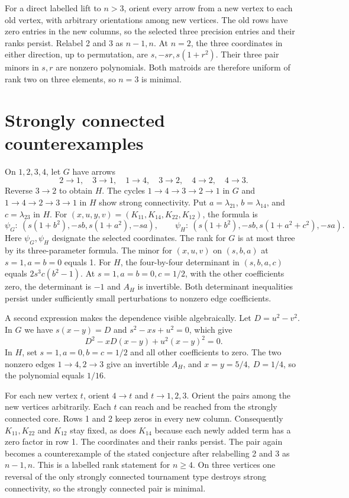 \documentclass[11pt,a4paper]{amsart}
\begin{document}
For a direct labelled lift to \(n>3\), orient every arrow from a
new vertex to each old vertex, with arbitrary orientations among
new vertices. The old rows have zero entries in the new columns,
so the selected three precision entries and their ranks persist.
Relabel 2 and 3 as \(n-1,n\).
At \(n=2\), the three coordinates in either direction, up to
permutation, are \(s,-sr,s(1+r^2)\). Their three pair minors in
\(s,r\) are nonzero polynomials. Both matroids are therefore uniform
of rank two on three elements, so \(n=3\) is minimal.

\section{Strongly connected counterexamples}

On \(1,2,3,4\), let \(G\) have arrows
\[
 2\to1,\quad3\to1,\quad1\to4,\quad3\to2,\quad4\to2,\quad4\to3 .
\]
Reverse \(3\to2\) to obtain \(H\). The cycles \(1\to4\to3\to2\to1\)
in \(G\) and \(1\to4\to2\to3\to1\) in \(H\) show strong connectivity.
Put \(a=\lambda_{21}\), \(b=\lambda_{14}\), and \(c=\lambda_{23}\)
in \(H\). For \((x,u,y,v)=(K_{11},K_{14},K_{22},K_{12})\), the formula is
\[
 \psi_G:\ (s(1+b^2),-sb,s(1+a^2),-sa),\qquad
 \psi_H:\ (s(1+b^2),-sb,s(1+a^2+c^2),-sa).
\]
Here \(\psi_G,\psi_H\) designate the selected coordinates.
The rank for \(G\) is at most three by its three-parameter formula.
The minor for \((x,u,v)\) on \((s,b,a)\) at \(s=1,a=b=0\)
equals 1. For \(H\), the four-by-four determinant in
\((s,b,a,c)\) equals \(2s^3c(b^2-1)\). At \(s=1,a=b=0,c=1/2\),
with the other coefficients zero, the determinant is \(-1\)
and \(A_H\) is invertible. Both determinant inequalities persist
under sufficiently small perturbations to nonzero edge coefficients.

A second expression makes the dependence visible algebraically.
Let \(D=u^2-v^2\). In \(G\) we have \(s(x-y)=D\) and
\(s^2-xs+u^2=0\), which give
\[
 D^2-xD(x-y)+u^2(x-y)^2=0.
\]
In \(H\), set \(s=1,a=0,b=c=1/2\) and all other coefficients to zero.
The two nonzero edges \(1\to4,2\to3\) give an invertible \(A_H\),
and \(x=y=5/4,\ D=1/4\), so the polynomial equals \(1/16\).

For each new vertex \(t\), orient \(4\to t\) and \(t\to1,2,3\).
Orient the pairs among the new vertices arbitrarily. Each \(t\) can
reach and be reached from the strongly connected core. Rows 1 and 2
keep zeros in every new column. Consequently \(K_{11},K_{22}\)
and \(K_{12}\) stay fixed, as does \(K_{14}\) because each newly
added term has a zero factor in row 1. The coordinates and their
ranks persist. The pair again becomes a counterexample of the
stated conjecture after relabelling 2 and 3 as \(n-1,n\).
This is a labelled rank statement for \(n\ge4\). On three vertices
one reversal of the only strongly connected tournament type destroys
strong connectivity, so the strongly connected pair is minimal.
\end{document}
